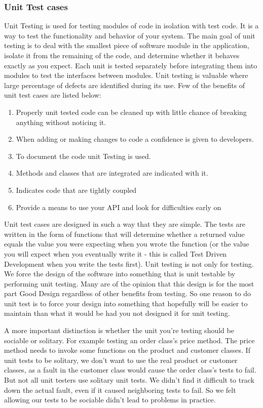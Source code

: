 \documentclass[article,type=msc,colorback,accentcolor=tud9c,twoside,11pt]{tudthesis}
\begin{document}
\subsubsection{Unit Test cases}
Unit Testing\cite{EffectivnessofUnitTest} is used for testing modules of code in isolation with test code. It is a way to test the functionality and behavior of your system. The main goal of unit testing is to deal with the smallest piece of software module in the application, isolate it from the remaining of the code, and determine whether it behaves exactly as you expect. Each unit is tested separately before integrating them into modules to test the interfaces between modules. Unit testing is valuable where large percentage of defects are identified during its use. Few of the benefits of unit test cases are listed below:
\begin{enumerate}
\item Properly unit tested code can be cleaned up with little chance of breaking anything without noticing it.
\item When adding or making changes to code a confidence is given to developers.
\item To document the code unit Testing is used.
\item Methods and classes that are integrated are indicated with it. 
\item Indicates code that are tightly coupled
\item Provide a means to use your API and look for difficulties early on 
\end{enumerate}
Unit test cases are designed in such a way that they are simple. The tests are written in the form of functions that will determine whether a returned value equals the value you were expecting when you wrote the function (or the value you will expect when you eventually write it - this is called Test Driven Development when you write the tests first). Unit testing is not only for testing. We force the design of the software into something that is unit testable by performing unit testing. Many are of the opinion that this design is for the most part Good Design regardless of other benefits from testing. So one reason to do unit test is to force your design into something that hopefully will be easier to maintain than what it would be had you not designed it for unit testing.

A more important distinction is whether the unit you're testing should be sociable or solitary. For example testing an order class's price method. The price method needs to invoke some functions on the product and customer classes. If unit tests to be solitary, we don't want to use the real product or customer classes, as a fault in the customer class would cause the order class's tests to fail. But not all unit testers use solitary unit tests. We didn't find it difficult to track down the actual fault, even if it caused neighboring tests to fail. So we felt allowing our tests to be sociable didn't lead to problems in practice.
\end{document}

